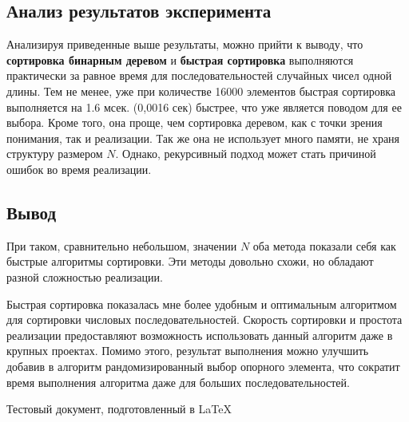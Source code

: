 \documentclass[a4paper,11pt]{article}
\begin{document}
\begin{center}
\section{Анализ результатов эксперимента}
\end{center}

Анализируя приведенные выше результаты, можно прийти к выводу, что  {\bf сортировка бинарным деревом} и {\bf быстрая сортировка} выполняются практически за равное время для последовательнос\-тей случайных чисел одной длины. Тем не менее, уже при количестве 16000 элементов быстрая сортировка выполняется на 1.6 мсек. (0,0016 сек) быстрее, что уже является поводом для ее выбора. Кроме того, она проще, чем сортировка деревом, как с точки зрения понимания, так и реализации. Так же она не использует много памяти, не храня структуру размером $N$. Однако, рекурсивный подход может стать причиной ошибок во время реализации.
\\

\begin{center}
\section{Вывод}
\end{center}

При таком, сравнительно небольшом, значении $N$ оба метода показали себя как быстрые алгоритмы сортировки. Эти методы довольно схожи, но обладают разной сложностью реализации.

Быстрая сортировка показалась мне более удобным и оптимальным алгоритмом для сортировки числовых последовательностей. Скорость сортировки и простота реализации предоставляют возможность использовать данный алгоритм даже в крупных проектах.  Помимо этого, результат выполнения можно улучшить добавив в алгоритм рандомизированный выбор опорного элемента, что сократит время выполнения алгоритма даже для больших последовательностей.
\vfill

\begin{center}
Тестовый документ, подготовленный в \LaTeX
\end{center}
  
\end{document}

